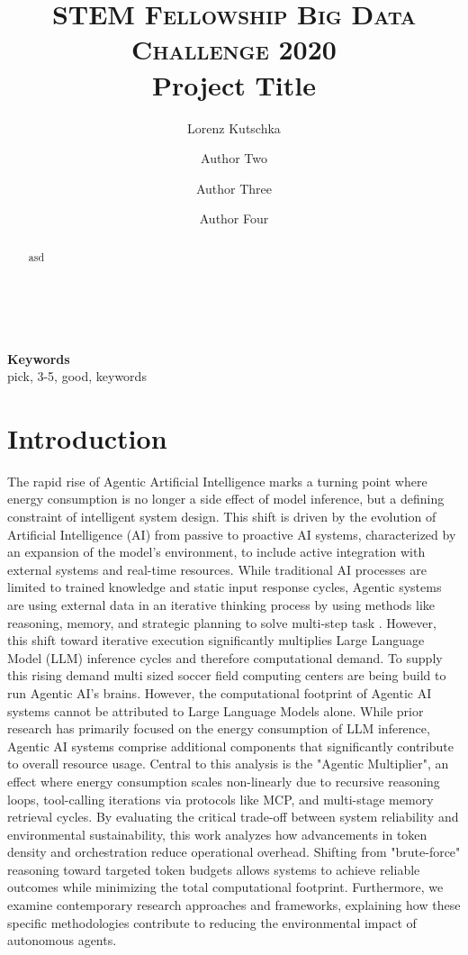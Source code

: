 \documentclass[10pt,twocolumn,letterpaper]{article}
\title{
		\usefont{OT1}{bch}{b}{n}
		\normalfont \normalsize \textsc{STEM Fellowship Big Data Challenge 2020} \\ [10pt]
		\huge Project Title \\
}
\author[1]{Lorenz Kutschka}
\author[1]{Author Two}
\author[1]{Author Three}
\author[2]{Author Four}
\affil[1]{High School 1}
\affil[2]{High School 2}
\begin{document}
\maketitle

\begin{abstract}
asd
\end{abstract} \\ 
\\ 
{\textbf{Keywords} \\
pick, 3-5, good, keywords}

\section{Introduction}
\label{sec:introduction}
The rapid rise of Agentic Artificial Intelligence marks a turning point where energy consumption is no longer a side effect of model inference, but a defining constraint of intelligent system design. This shift is driven by the evolution of Artificial Intelligence (AI) from passive to proactive AI systems, characterized by an expansion of the model's environment, to include active integration with external systems and real-time resources. While traditional AI processes are limited to trained knowledge and static input response cycles, Agentic systems are using external data in an iterative thinking process by using methods like reasoning, memory, and strategic planning to solve multi-step task \citep{Xu_2026, Nisa_Shirazi_Saip_Pozi_2025}. However, this shift toward iterative execution significantly multiplies Large Language Model (LLM) inference cycles and therefore computational demand. To supply this rising demand multi sized soccer field computing centers are being build to run Agentic AI's brains. However, the computational footprint of Agentic AI systems cannot be attributed to Large Language Models alone. While prior research \citep{Jegham_Abdelatti_Elmoubarki_Hendawi_2025, Oviedo_Kazhamiaka_Choukse_Kim_Luers_Nakagawa_Bianchini_Ferres_2025a} has primarily focused on the energy consumption of LLM inference, Agentic AI systems comprise additional components that significantly contribute to overall resource usage. Central to this analysis is the "Agentic Multiplier", an effect where energy consumption scales non-linearly due to recursive reasoning loops, tool-calling iterations via protocols like MCP, and multi-stage memory retrieval cycles. By evaluating the critical trade-off between system reliability and environmental sustainability, this work analyzes how advancements in token density and orchestration reduce operational overhead. Shifting from "brute-force" reasoning toward targeted token budgets allows systems to achieve reliable outcomes while minimizing the total computational footprint. Furthermore, we examine contemporary research approaches and frameworks, explaining how these specific methodologies contribute to reducing the environmental impact of autonomous agents.
\end{document}
